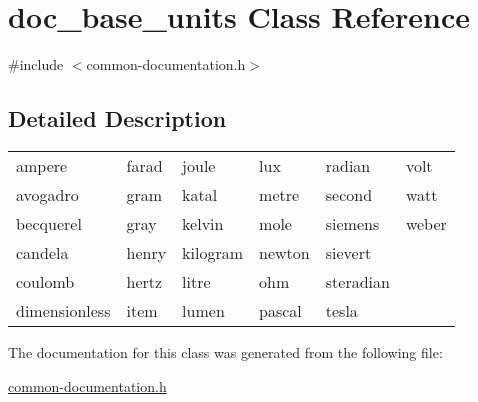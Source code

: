 \hypertarget{classdoc__base__units}{}\section{doc\+\_\+base\+\_\+units Class Reference}
\label{classdoc__base__units}


{\ttfamily \#include $<$common-\/documentation.\+h$>$}



\subsection{Detailed Description}
\begin{DoxyParagraph}{}
\tabulinesep=1mm
\begin{longtabu} spread 0pt [c]{*{6}{|X[-1]}|}
\hline
ampere&farad&joule&lux&radian&volt  \\
avogadro&gram&katal&metre&second&watt  \\
becquerel&gray&kelvin&mole&siemens&weber  \\
candela&henry&kilogram&newton&sievert  \\
coulomb&hertz&litre&ohm&steradian  \\
dimensionless&item&lumen&pascal&tesla  \\
\end{longtabu}

\end{DoxyParagraph}


The documentation for this class was generated from the following file\+:\begin{DoxyCompactItemize}
\item 
\hyperlink{common-documentation_8h}{common-\/documentation.\+h}\end{DoxyCompactItemize}

